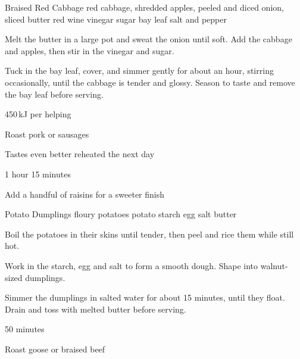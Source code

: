 \documentclass[a4paper,11pt]{article}
\renewcommand*{\energy}[1]{\item #1\,kJ per helping}
\renewcommand*{\sidedish}[1]{\item[Side dish] #1}
\renewcommand*{\hint}[1]{\item[Hint] #1}
\renewcommand*{\preparationtime}[1]{\item[Preparation time] #1}
\renewcommand*{\modification}[1]{\item[Modification] #1}
\begin{document}
\begin{recipe}{Braised Red Cabbage}
 red cabbage, shredded
 apples, peeled and diced
 onion, sliced
 butter
 red wine vinegar
 sugar
 bay leaf
 salt and pepper

Melt the butter in a large pot and sweat the onion until soft.
Add the cabbage and apples, then stir in the vinegar and sugar.

Tuck in the bay leaf, cover, and simmer gently for about an hour,
stirring occasionally, until the cabbage is tender and glossy.
Season to taste and remove the bay leaf before serving.

\energy{450}
\sidedish{Roast pork or sausages}
\hint{Tastes even better reheated the next day}
\preparationtime{1 hour 15 minutes}
\modification{Add a handful of raisins for a sweeter finish}
\end{recipe}

\begin{recipe}{Potato Dumplings}
 floury potatoes
 potato starch
 egg
 salt
 butter

Boil the potatoes in their skins until tender, then peel and rice
them while still hot.

Work in the starch, egg and salt to form a smooth dough. Shape into
walnut-sized dumplings.

Simmer the dumplings in salted water for about 15 minutes, until
they float. Drain and toss with melted butter before serving.

\preparationtime{50 minutes}
\sidedish{Roast goose or braised beef}
\end{recipe}
\end{document}
